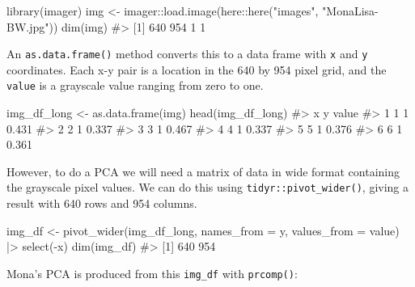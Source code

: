 \documentclass[
  letterpaper,
  10pt,
  krantz2]{krantz}
\makeatletter
\newenvironment{Shaded}{\begin{snugshade}}{\end{snugshade}}
\newcommand{\AttributeTok}[1]{\textcolor[rgb]{0.40,0.45,0.13}{#1}}
\newcommand{\CommentTok}[1]{\textcolor[rgb]{0.37,0.37,0.37}{#1}}
\newcommand{\FunctionTok}[1]{\textcolor[rgb]{0.28,0.35,0.67}{#1}}
\newcommand{\NormalTok}[1]{\textcolor[rgb]{0.00,0.23,0.31}{#1}}
\newcommand{\OtherTok}[1]{\textcolor[rgb]{0.00,0.23,0.31}{#1}}
\newcommand{\SpecialCharTok}[1]{\textcolor[rgb]{0.37,0.37,0.37}{#1}}
\newcommand{\StringTok}[1]{\textcolor[rgb]{0.13,0.47,0.30}{#1}}
\newenvironment{kframe}{%
  \medskip{}
  \setlength{\fboxsep}{.8em}
  \def\at@end@of@kframe{}%
  \ifinner\ifhmode%
  \def\at@end@of@kframe{\end{minipage}}%
  \begin{minipage}{\columnwidth}%
  \fi\fi%
  \def\FrameCommand##1{\hskip\@totalleftmargin \hskip-\fboxsep
  \colorbox{shadecolor}{##1}\hskip-\fboxsep
      \hskip-\linewidth \hskip-\@totalleftmargin \hskip\columnwidth}%
  \MakeFramed {\advance\hsize-\width
    \@totalleftmargin\z@ \linewidth\hsize
    \@setminipage}}%
{\par\unskip\endMakeFramed%
  \at@end@of@kframe}
\renewenvironment{Shaded}{\begin{kframe}}{\end{kframe}}
\makeatother
\begin{document}
\begin{Shaded}
\begin{Highlighting}[]
\FunctionTok{library}\NormalTok{(imager)}
\NormalTok{img }\OtherTok{\textless{}{-}}\NormalTok{ imager}\SpecialCharTok{::}\FunctionTok{load.image}\NormalTok{(here}\SpecialCharTok{::}\FunctionTok{here}\NormalTok{(}\StringTok{"images"}\NormalTok{, }\StringTok{"MonaLisa{-}BW.jpg"}\NormalTok{))}
\FunctionTok{dim}\NormalTok{(img)}
\CommentTok{\#\textgreater{} [1] 640 954   1   1}
\end{Highlighting}
\end{Shaded}

An \texttt{as.data.frame()} method converts this to a data frame with
\texttt{x} and \texttt{y} coordinates. Each x-y pair is a location in
the 640 by 954 pixel grid, and the \texttt{value} is a grayscale value
ranging from zero to one.

\begin{Shaded}
\begin{Highlighting}[]
\NormalTok{img\_df\_long }\OtherTok{\textless{}{-}} \FunctionTok{as.data.frame}\NormalTok{(img)}
\FunctionTok{head}\NormalTok{(img\_df\_long)}
\CommentTok{\#\textgreater{}   x y value}
\CommentTok{\#\textgreater{} 1 1 1 0.431}
\CommentTok{\#\textgreater{} 2 2 1 0.337}
\CommentTok{\#\textgreater{} 3 3 1 0.467}
\CommentTok{\#\textgreater{} 4 4 1 0.337}
\CommentTok{\#\textgreater{} 5 5 1 0.376}
\CommentTok{\#\textgreater{} 6 6 1 0.361}
\end{Highlighting}
\end{Shaded}

However, to do a PCA we will need a matrix of data in wide format
containing the grayscale pixel values. We can do this using
\texttt{tidyr::pivot\_wider()}, giving a result with 640 rows and 954
columns.

\begin{Shaded}
\begin{Highlighting}[]
\NormalTok{img\_df }\OtherTok{\textless{}{-}} \FunctionTok{pivot\_wider}\NormalTok{(img\_df\_long, }
                     \AttributeTok{names\_from =}\NormalTok{ y, }
                     \AttributeTok{values\_from =}\NormalTok{ value) }\SpecialCharTok{|\textgreater{}}
  \FunctionTok{select}\NormalTok{(}\SpecialCharTok{{-}}\NormalTok{x)}
\FunctionTok{dim}\NormalTok{(img\_df)}
\CommentTok{\#\textgreater{} [1] 640 954}
\end{Highlighting}
\end{Shaded}

Mona's PCA is produced from this \texttt{img\_df} with
\texttt{prcomp()}:
\end{document}
